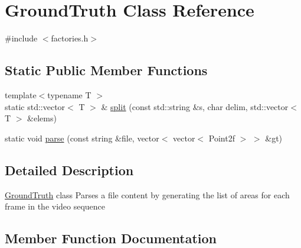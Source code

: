 \hypertarget{class_ground_truth}{}\section{Ground\+Truth Class Reference}
\label{class_ground_truth}


{\ttfamily \#include $<$factories.\+h$>$}

\subsection*{Static Public Member Functions}
\begin{DoxyCompactItemize}
\item 
{\footnotesize template$<$typename T $>$ }\\static std\+::vector$<$ T $>$ \& \hyperlink{class_ground_truth_a40810dbf51d6d4e3474baf61bbe72438}{split} (const std\+::string \&s, char delim, std\+::vector$<$ T $>$ \&elems)
\item 
static void \hyperlink{class_ground_truth_a5238ba2a108dc683ab7cfef7c0414e8d}{parse} (const string \&file, vector$<$ vector$<$ Point2f $>$ $>$ \&gt)
\end{DoxyCompactItemize}


\subsection{Detailed Description}
\hyperlink{class_ground_truth}{Ground\+Truth} class Parses a file content by generating the list of areas for each frame in the video sequence 

\subsection{Member Function Documentation}
